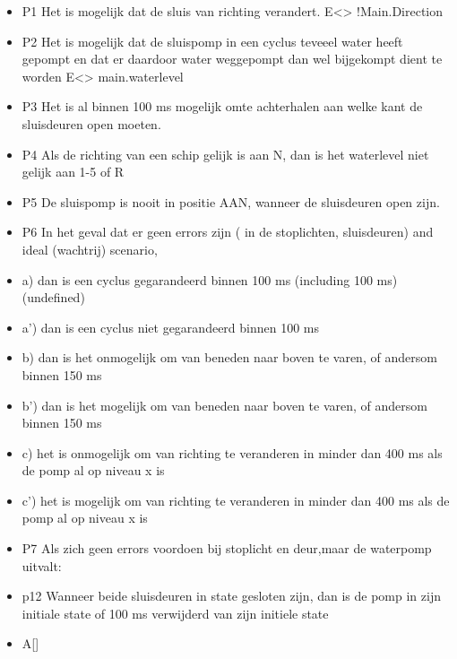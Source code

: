 \documentclass{article}
\begin{document}
	\begin{itemize}
		\item  P1 Het is mogelijk dat de sluis van richting verandert.
		E<> !Main.Direction
		\item  P2 Het is mogelijk dat de sluispomp in een cyclus teveeel water heeft gepompt en dat er daardoor water weggepompt dan wel bijgekompt dient te worden
		E<> main.waterlevel
		\item  P3 Het is al binnen 100 ms mogelijk omte achterhalen aan welke kant de sluisdeuren  open moeten.
		\item  P4 Als de richting van een schip gelijk is aan N, dan is het waterlevel niet gelijk aan 1-5 of R
		\item  P5 De sluispomp is nooit in positie AAN, wanneer de sluisdeuren open zijn.
		\item  P6 In het geval dat er geen errors zijn (  in de stoplichten, sluisdeuren) and ideal (wachtrij) scenario,
		\item  a) dan is een cyclus gegarandeerd binnen 100 ms (including 100 ms) (undefined)
		\item  a') dan is een cyclus niet gegarandeerd binnen 100 ms
		\item  b)  dan is het onmogelijk om van beneden naar boven te varen, of andersom binnen 150 ms
		\item  b') dan is het mogelijk om van beneden naar boven te varen, of andersom binnen 150 ms
		\item  c) het is onmogelijk om van richting te veranderen in minder dan 400 ms als de pomp al op niveau x is
		\item  c') het is mogelijk om van richting te veranderen in minder dan 400 ms als de pomp al op niveau x is
		\item  P7 Als zich geen errors voordoen bij stoplicht en deur,maar de waterpomp uitvalt:
 
 
		
		
 
		\item  p12 Wanneer beide sluisdeuren in state gesloten zijn, dan is de pomp in zijn initiale state of 100 ms verwijderd van zijn initiele state
		\item  A[]
 

\end{itemize}
\end{document}
